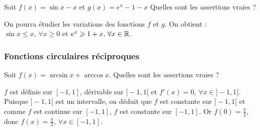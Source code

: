 \begin{question} 

Soit   $f(x)= \sin x -x$ et $g(x)= e^x-1-x$  Quelles sont les assertions vraies ?

\begin{answers}



\end{answers}
\begin{explanations}
On pourra étudier les variations des fonctions $f$ et $g$. On obtient :  $\sin x \le x, \, \forall x\ge 0$ et $e^x \geqslant 1+x, \, \forall x\in \mathbb{R}$.
\end{explanations}


\end{question}



\subsubsection{Fonctions circulaires réciproques}



\begin{question} 

Soit $f(x)=\arcsin x + \arccos x$.  Quelles sont les assertions vraies ?

\begin{answers}



\end{answers}
\begin{explanations}
$f$ est définie sur $[-1,1]$,  dérivable sur $]-1,1[$  et $f'(x)=0$, $\forall x \in ]-1,1[$. Puisque $]-1,1[$ est un intervalle, on déduit que $f$ est constante sur $]-1,1[$ et comme $f$ est continue sur $[-1,1]$, $f$ est constante sur $[-1,1]$. Or $f(0)=\frac{\pi}{2}$, donc $f(x)=\frac{\pi}{2}, \, \forall x \in [-1,1]$.
\end{explanations}


\end{question}


